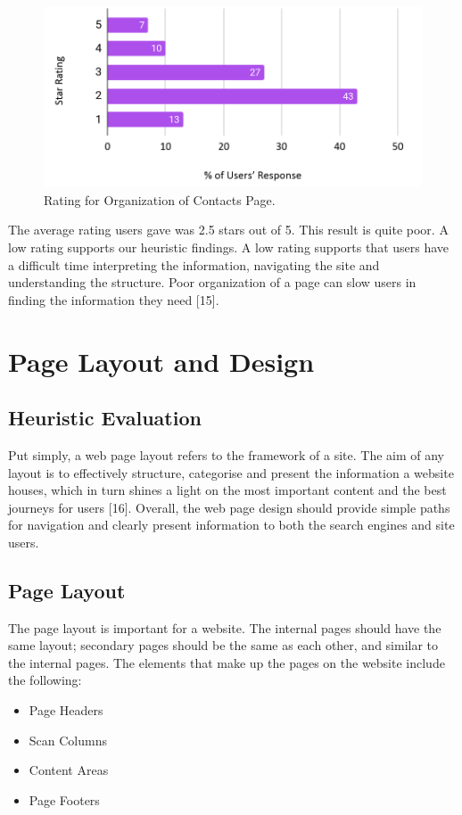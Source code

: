 \documentclass[12pt]{article}
\begin{document}
\begin{figure}[ht]
\centering
\includegraphics[width=1.0\textwidth]{f5}
\caption[Rating for Organization of Contacts Page]{Rating for Organization of Contacts Page\footnotemark.}
\end{figure} 
The average rating users gave was 2.5 stars out of 5. This result is quite poor. A low rating supports our heuristic findings. A low rating supports that users have a difficult time interpreting the information, navigating the site and understanding the structure. Poor organization of a page can slow users in finding the information they need [15].

\section{Page Layout and Design}



\subsection{Heuristic Evaluation}
Put simply, a web page layout refers to the framework of a site. The aim of any layout is to effectively structure, categorise and present the information a website houses, which in turn shines a light on the most important content and the best journeys for users [16]. Overall, the web page design should provide simple paths for navigation and clearly present information to both the search engines and site users. 
\subsection*{Page Layout }
The page layout is important for a website. The internal pages should have the same layout; secondary pages should be the same as each other, and similar to the internal pages. The  elements that make up the pages on the website include the following:
\begin{itemize}
\item Page Headers
\item Scan Columns
\item Content Areas
\item Page Footers
\end{itemize}
\end{document}
